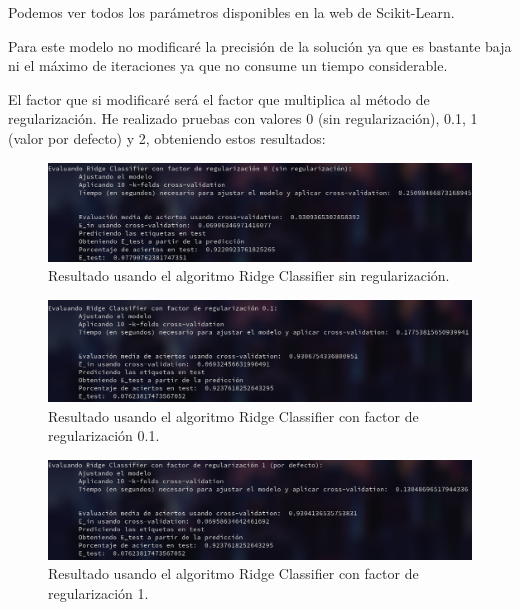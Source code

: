 \documentclass[12pt, spanish]{article}
\begin{document}
Podemos ver todos los parámetros disponibles en la web de Scikit-Learn\cite{ridge}.


Para este modelo no modificaré la precisión de la solución ya que es bastante baja ni el máximo de iteraciones ya que no consume un tiempo considerable.

El factor que si modificaré será el factor que multiplica al método de regularización. He realizado pruebas con valores 0 (sin regularización), 0.1, 1 (valor por defecto) y 2, obteniendo estos resultados:



\begin{figure}[H]
	\centering
	\includegraphics[scale=0.45]{clasificacion/ridge0.png}
	\caption{Resultado usando el algoritmo Ridge Classifier sin regularización.}
	\label{ridge0}
\end{figure}


\begin{figure}[H]
	\centering
	\includegraphics[scale=0.45]{clasificacion/ridge01.png}
	\caption{Resultado usando el algoritmo Ridge Classifier con factor de regularización 0.1.}
	\label{ridge01}
\end{figure}



\begin{figure}[H]
	\centering
	\includegraphics[scale=0.45]{clasificacion/ridge1.png}
	\caption{Resultado usando el algoritmo Ridge Classifier con factor de regularización 1.}
	\label{ridge1}
\end{figure}
\end{document}
